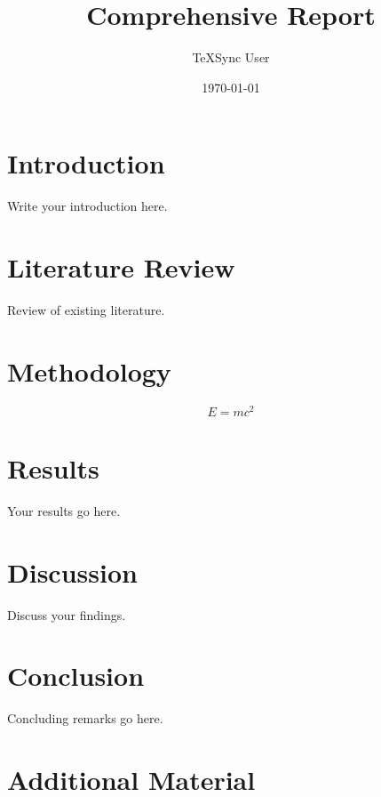\documentclass{report}
\title{Comprehensive Report}
\author{TeXSync User}
\date{\today}
\begin{document}
\maketitle
\tableofcontents

\chapter{Introduction}
Write your introduction here.

\chapter{Literature Review}
Review of existing literature.

\chapter{Methodology}
$$E = mc^2$$

\chapter{Results}
Your results go here.

\chapter{Discussion}
Discuss your findings.

\chapter{Conclusion}
Concluding remarks go here.

\appendix
\chapter{Additional Material}
\end{document}
